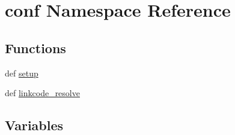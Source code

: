 \hypertarget{namespaceconf}{}\section{conf Namespace Reference}
\label{namespaceconf}
\subsection*{Functions}
\begin{DoxyCompactItemize}
\item 
def \hyperlink{namespaceconf_a504e29527d5ed4b694637a2536315abf}{setup}
\item 
def \hyperlink{namespaceconf_a33aa94cd770584e20ad39bc526304f5e}{linkcode\+\_\+resolve}
\end{DoxyCompactItemize}
\subsection*{Variables}
